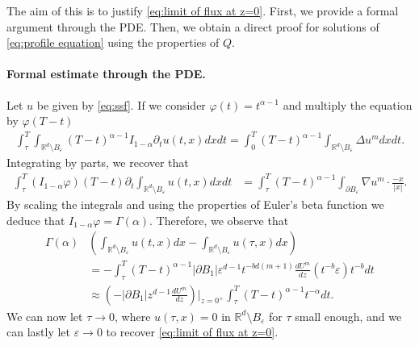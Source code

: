 \documentclass[a4paper]{article}
\theoremstyle{definition}
\newcommand{\Rd}{{\mathbb{R}^d}}
\begin{document}
The aim of this is to justify \eqref{eq:limit of flux at z=0}.
First, we provide a formal argument through the PDE.
Then, we obtain a direct proof for solutions of \eqref{eq:profile equation} using the properties of $Q$.

\paragraph{Formal estimate through the PDE.}
Let $u$ be given by \eqref{eq:ssf}. If we consider $\varphi(t) = t^{\alpha - 1}$ and multiply the equation by $\varphi(T-t)$
\begin{align*}
  \int_\tau^T \int_{\Rd \setminus B_\varepsilon} (T-t)^{\alpha - 1} I_{1-\alpha} \partial_t u(t,x) dx dt = \int_0^T (T-t)^{\alpha - 1} \int_{\Rd \setminus B_\varepsilon} \Delta u^{m} dx dt.
\end{align*}
Integrating by parts, we recover that
\begin{align*}
  \int_\tau^T  (I_{1-\alpha}\varphi)(T-t)  \partial_t \int_{\Rd \setminus B_\varepsilon} u(t,x) dx dt
  & = \int_\tau^T (T-t)^{\alpha - 1} \int_{\partial B_\varepsilon} \nabla u^{m} \cdot \frac{-x}{|x|}.
\end{align*}
By scaling the integrals and using the properties of Euler's beta function we deduce that $I_{1-\alpha} \varphi = \Gamma(\alpha)$.
Therefore, we observe that
\begin{align*}
  \Gamma(\alpha)
  & \left( \int_{\Rd \setminus B_\varepsilon} u(t, x)dx - \int_{\Rd \setminus B_\varepsilon} u(\tau,x)dx  \right)
  \\
  & = -\int_\tau^T (T-t)^{\alpha - 1} |\partial B_1| \varepsilon^{d-1} t^{-bd(m+1)}\frac{dU^{m}}{dz}(t^{-b}\varepsilon) t^{-b} dt
  \\ &\approx \left(-|\partial B_1| z^{d-1} \frac{dU^{m}}{dz} \right)\Bigg|_{z = 0^+} \int_\tau^T (T-t)^{\alpha - 1} t^{-\alpha} dt.
\end{align*}
We can now let $\tau \to 0$, where $u(\tau,x) = 0$ in $\Rd \setminus B_\varepsilon$ for $\tau$ small enough, and we can lastly let $\varepsilon \to 0$ to recover \eqref{eq:limit of flux at z=0}.

%
\end{document}
